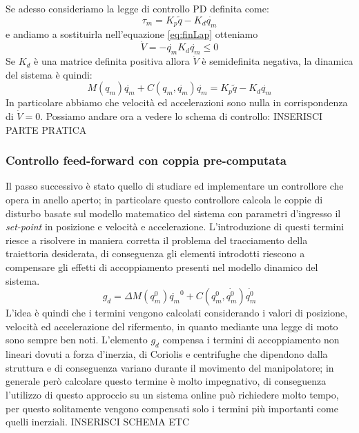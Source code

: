 Se adesso consideriamo la legge di controllo PD definita come:
\begin{equation}
\tau_m = K_p\tilde{q} - K_d\dot{q_m}
\end{equation}
e andiamo a sostituirla nell'equazione \ref{eq:finLap} otteniamo
\begin{equation*}
\dot{V} = -\dot{q_m}K_d \dot{q_m} \le 0
\end{equation*}
Se $K_d$ è una matrice definita positiva allora $\dot{V}$ è semidefinita negativa, la dinamica del sistema è quindi:
\begin{equation}
M(q_m)\ddot{q_m} + C(q_m,\dot{q_m})\dot{q_m} = K_p\tilde{q}-K_d\dot{q_m}
\end{equation}
In particolare abbiamo che velocità ed accelerazioni sono nulla in corrispondenza di $\dot{V} = 0$. Possiamo andare ora a vedere lo schema di controllo:
INSERISCI PARTE PRATICA
\subsubsection{Controllo feed-forward con coppia pre-computata}
Il passo successivo è stato quello di studiare ed implementare un controllore che opera in anello aperto; in particolare questo controllore calcola le coppie di disturbo basate sul modello matematico del sistema con parametri d'ingresso il \textit{set-point} in posizione e velocità e accelerazione. L'introduzione di questi termini riesce a risolvere in maniera corretta il problema del tracciamento della traiettoria desiderata, di conseguenza gli elementi introdotti riescono a compensare gli effetti di accoppiamento presenti nel modello dinamico del sistema. 
\begin{equation}
g_d = \Delta M(q^0_m)\ddot{q_m}^0 + C(q^0_m,\dot{q_m^0})\dot{q_m^0}
\end{equation}
L'idea è quindi che i termini vengono calcolati considerando i valori di posizione, velocità ed accelerazione del rifermento, in quanto mediante una legge di moto sono sempre ben noti. L'elemento $g_d$ compensa i termini di accoppiamento non lineari dovuti a forza d'inerzia, di Coriolis e centrifughe che dipendono dalla struttura e di conseguenza variano durante il movimento del manipolatore; in generale però calcolare questo termine è molto impegnativo, di conseguenza l'utilizzo di questo approccio su un sistema online può richiedere molto tempo, per questo solitamente vengono compensati solo i termini più importanti come quelli inerziali.
INSERISCI SCHEMA ETC
